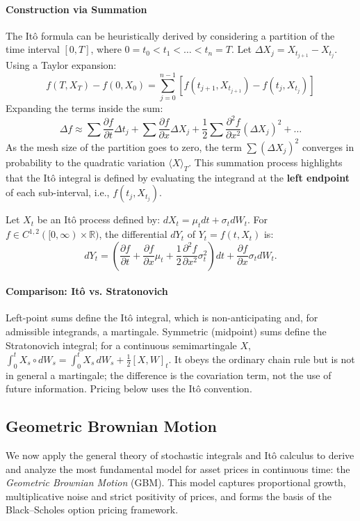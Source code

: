 \paragraph{Construction via Summation}
The Itô formula can be heuristically derived by considering a partition of the time interval $[0, T]$, where $0 = t_0 < t_1 < \dots < t_n = T$. Let $\Delta X_j = X_{t_{j+1}} - X_{t_j}$. Using a Taylor expansion:
\[
f(T, X_T) - f(0, X_0) = \sum_{j=0}^{n-1} [f(t_{j+1}, X_{t_{j+1}}) - f(t_j, X_{t_j})]
\]
Expanding the terms inside the sum:
\[
\Delta f \approx \sum \frac{\partial f}{\partial t} \Delta t_j + \sum \frac{\partial f}{\partial x} \Delta X_j + \frac{1}{2} \sum \frac{\partial^2 f}{\partial x^2} (\Delta X_j)^2 + \dots
\]
As the mesh size of the partition goes to zero, the term $\sum (\Delta X_j)^2$ converges in probability to the quadratic variation $\langle X \rangle_T$. This summation process highlights that the Itô integral is defined by evaluating the integrand at the \textbf{left endpoint} of each sub-interval, i.e., $f(t_j, X_{t_j})$.

\begin{theorem}
Let $X_t$ be an Itô process defined by: $dX_t = \mu_t dt + \sigma_t dW_t$.
For $f \in C^{1,2}([0, \infty) \times \mathbb{R})$, the differential $dY_t$ of $Y_t = f(t, X_t)$ is:
\[
dY_t = \left( \frac{\partial f}{\partial t} + \frac{\partial f}{\partial x} \mu_t + \frac{1}{2} \frac{\partial^2 f}{\partial x^2} \sigma_t^2 \right) dt + \frac{\partial f}{\partial x} \sigma_t dW_t.
\]
\end{theorem}
\paragraph{Comparison: It\^o vs. Stratonovich}
Left-point sums define the It\^o integral, which is non-anticipating and, for
admissible integrands, a martingale. Symmetric (midpoint) sums define the
Stratonovich integral; for a continuous semimartingale $X$,
$\int_0^t X_s\circ dW_s=\int_0^t X_s\,dW_s+\tfrac12[X,W]_t$. It obeys the ordinary
chain rule but is not in general a martingale; the difference is the covariation
term, not the use of future information. Pricing below uses the It\^o convention.
\subsection{Geometric Brownian Motion}\label{sec:gbm}

We now apply the general theory of stochastic integrals and Itô calculus to derive and analyze the most fundamental model for asset prices in continuous time: the \emph{Geometric Brownian Motion} (GBM). This model captures proportional growth, multiplicative noise and strict positivity of prices, and forms the basis of the Black--Scholes option pricing framework.

